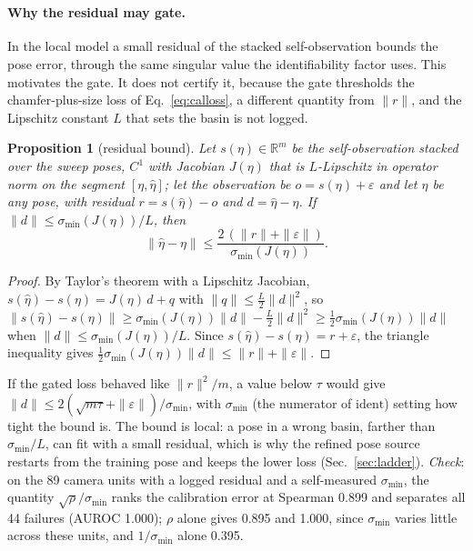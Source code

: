 \documentclass{article}
\newtheorem{proposition}{Proposition}
\newcommand{\ident}{\mathrm{ident}}
\newcommand{\ph}{\textsuperscript{\dag}}
\begin{document}
\paragraph{Why the residual may gate\ph.} In the local model a small residual of the stacked self-observation bounds
the pose error, through the same singular value the identifiability factor uses. This motivates the gate. It does not
certify it, because the gate thresholds the chamfer-plus-size loss of Eq.~\ref{eq:calloss}, a different quantity from
$\|r\|$, and the Lipschitz constant $L$ that sets the basin is not logged.

\begin{proposition}[residual bound]
\label{prop:cert}
Let $s(\eta) \in \mathbb{R}^m$ be the self-observation stacked over the sweep poses, $C^1$ with Jacobian $J(\eta)$ that
is $L$-Lipschitz in operator norm on the segment $[\eta, \hat\eta]$; let the observation be $o = s(\eta) + \varepsilon$ and
let $\hat\eta$ be any pose, with residual $r = s(\hat\eta) - o$ and $d = \hat\eta - \eta$. If $\|d\| \le
\sigma_{\min}(J(\eta))/L$, then
\begin{equation}
\|\hat\eta - \eta\| \le \frac{2\,(\|r\| + \|\varepsilon\|)}{\sigma_{\min}(J(\eta))}.
\label{eq:cert}
\end{equation}
\end{proposition}
\begin{proof}
By Taylor's theorem with a Lipschitz Jacobian, $s(\hat\eta) - s(\eta) = J(\eta)\,d + q$ with $\|q\| \le \tfrac{L}{2}\|d\|^2$,
so $\|s(\hat\eta) - s(\eta)\| \ge \sigma_{\min}(J(\eta))\|d\| - \tfrac{L}{2}\|d\|^2 \ge \tfrac12\sigma_{\min}(J(\eta))\|d\|$
when $\|d\| \le \sigma_{\min}(J(\eta))/L$. Since $s(\hat\eta) - s(\eta) = r + \varepsilon$, the triangle inequality gives
$\tfrac12\sigma_{\min}(J(\eta))\|d\| \le \|r\| + \|\varepsilon\|$.
\end{proof}
If the gated loss behaved like $\|r\|^2/m$, a value below $\tau$ would give $\|d\| \le 2(\sqrt{m\tau} +
\|\varepsilon\|)/\sigma_{\min}$, with $\sigma_{\min}$ (the numerator of $\ident$) setting how tight the bound is. The
bound is local: a pose in a wrong basin, farther than $\sigma_{\min}/L$, can fit with a small residual, which is why the
refined pose source restarts from the training pose and keeps the lower loss (Sec.~\ref{sec:ladder}). \emph{Check}: on the 89 camera units with a logged residual and a self-measured $\sigma_{\min}$, the
quantity $\sqrt\rho/\sigma_{\min}$ ranks the calibration error at Spearman 0.899 and separates all 44 failures (AUROC
1.000); $\rho$ alone gives 0.895 and 1.000, since $\sigma_{\min}$ varies little across these units, and $1/\sigma_{\min}$
alone 0.395.
\end{document}

